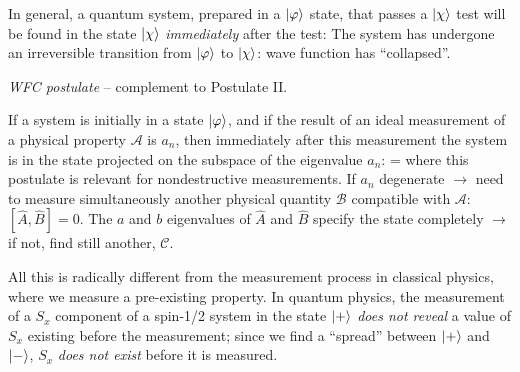 \documentclass[12pt]{article}
\begin{document}
In general, a quantum system, prepared in a
$\ket{\varphi}$ state, that passes a $\ket{\chi}$ test will be
found in the state $\ket{\chi}$ \emph{immediately} after the test:
\be
\ket{\varphi} 
\ee
The system has undergone an irreversible
transition from $\ket{\varphi}$ to $\ket{\chi}$: wave function has ``collapsed''.

\emph{WFC postulate} -- complement to Postulate II.

If a system is initially in a state $\ket{\varphi}$,
and if the result of an ideal measurement
of a physical property $\mathcal{A}$ is $a_n$, then
immediately after this measurement the
system is in the state projected on the
subspace of the eigenvalue $a_n$:
\be
\ket{\varphi} \to \ket{\psi} = 
\ee
where this postulate is relevant for nondestructive measurements.
If $a_n$ degenerate $\to$ need to measure
simultaneously another physical
quantity $\mathcal{B}$ compatible with
$\mathcal{A}$: $[\hat{A},\hat{B}] = 0$.
The $a$ and $b$ eigenvalues of $\hat{A}$ and $\hat{B}$ specify the state completely $\to$ if not, find still another, $\mathcal{C}$.


All this is radically different from the measurement
process in classical physics, where we measure a pre-existing property.
In quantum physics, the measurement of
a $S_x$ component of a spin-1/2 system
in the state $\ket{+}$ \emph{does not reveal} a value
of $S_x$ existing before the measurement;
since we find a ``spread'' between $\ket{+}$ and $\ket{-}$,
$S_x$ \emph{does not exist} before it is measured.
\end{document}
